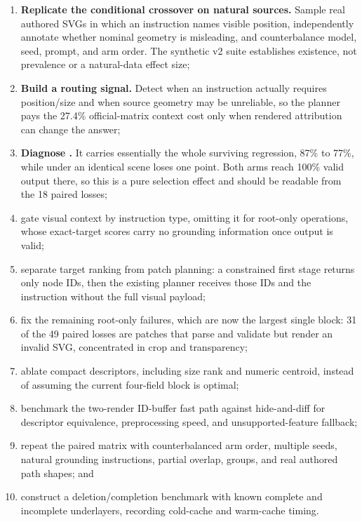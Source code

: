 \documentclass[10pt,a4paper]{article}
\newcommand{\code}[1]{\texttt{\detokenize{#1}}}
\begin{document}
\begin{enumerate}
  \item \textbf{Replicate the conditional crossover on natural sources.}
  Sample real authored SVGs in which an instruction names visible position,
  independently annotate whether nominal geometry is misleading, and
  counterbalance model, seed, prompt, and arm order. The synthetic v2 suite
  establishes existence, not prevalence or a natural-data effect size;
  \item \textbf{Build a routing signal.} Detect when an instruction actually
  requires position/size and when source geometry may be unreliable, so the
  planner pays the 27.4\% official-matrix context cost only when rendered
  attribution can change the answer;
  \item \textbf{Diagnose \code{change_color}.} It carries essentially the
  whole surviving regression, 87\% to 77\%, while \code{set_contour} under an
  identical scene loses one point. Both arms reach 100\% valid output there,
  so this is a pure selection effect and should be readable from the 18 paired
  losses;
  \item gate visual context by instruction type, omitting it for root-only
  operations, whose exact-target scores carry no grounding information once
  output is valid;
  \item separate target ranking from patch planning: a constrained first stage
  returns only node IDs, then the existing planner receives those IDs and the
  instruction without the full visual payload;
  \item fix the remaining root-only failures, which are now the largest single
  block: 31 of the 49 paired losses are patches that parse and validate but
  render an invalid SVG, concentrated in crop and transparency;
  \item ablate compact descriptors, including size rank and numeric centroid,
  instead of assuming the current four-field block is optimal;
  \item benchmark the two-render ID-buffer fast path against hide-and-diff for
  descriptor equivalence, preprocessing speed, and unsupported-feature
  fallback;
  \item repeat the paired matrix with counterbalanced arm order, multiple
  seeds, natural grounding instructions, partial overlap, groups, and real
  authored path shapes; and
  \item construct a deletion/completion benchmark with known complete and
  incomplete underlayers, recording cold-cache and warm-cache timing.
\end{enumerate}
\end{document}
